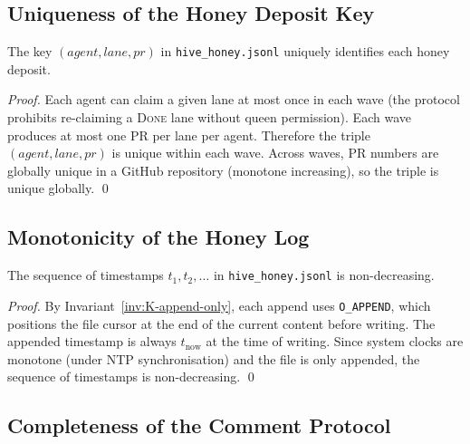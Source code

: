 \subsection{Uniqueness of the Honey Deposit Key}
\label{ssec:K-honey-key-unique}

\begin{lemma}
\label{lem:K-honey-key}
The key $(\textit{agent}, \textit{lane}, \textit{pr})$ in
\texttt{hive\_honey.jsonl} uniquely identifies each honey deposit.
\end{lemma}
\begin{proof}
Each agent can claim a given lane at most once in each wave (the
protocol prohibits re-claiming a \textsc{Done} lane without queen
permission). Each wave produces at most one PR per lane per agent.
Therefore the triple $(\textit{agent}, \textit{lane}, \textit{pr})$
is unique within each wave. Across waves, PR numbers are globally
unique in a GitHub repository (monotone increasing), so the triple
is unique globally.
\qed
\end{proof}

\subsection{Monotonicity of the Honey Log}
\label{ssec:K-honey-monotone}

\begin{lemma}
\label{lem:K-honey-monotone}
The sequence of timestamps $t_1, t_2, \ldots$ in
\texttt{hive\_honey.jsonl} is non-decreasing.
\end{lemma}
\begin{proof}
By Invariant~\ref{inv:K-append-only}, each append uses
\texttt{O\_APPEND}, which positions the file cursor at the end of the
current content before writing. The appended timestamp is always
$t_{\text{now}}$ at the time of writing. Since system clocks are
monotone (under NTP synchronisation) and the file is only appended,
the sequence of timestamps is non-decreasing.
\qed
\end{proof}

\subsection{Completeness of the Comment Protocol}
\label{ssec:K-completeness}

